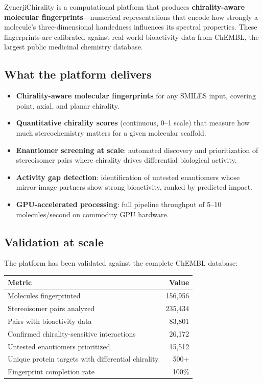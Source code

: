\documentclass[11pt,a4paper]{article}
\begin{document}
ZynerjiChirality is a computational platform that produces \textbf{chirality-aware
molecular fingerprints}---numerical representations that encode how strongly a
molecule's three-dimensional handedness influences its spectral properties. These
fingerprints are calibrated against real-world bioactivity data from ChEMBL, the
largest public medicinal chemistry database.

\subsection*{What the platform delivers}

\begin{itemize}[leftmargin=1.5em]
  \item \textbf{Chirality-aware molecular fingerprints} for any SMILES input,
    covering point, axial, and planar chirality.
  \item \textbf{Quantitative chirality scores} (continuous, 0--1 scale) that
    measure how much stereochemistry matters for a given molecular scaffold.
  \item \textbf{Enantiomer screening at scale}: automated discovery and
    prioritization of stereoisomer pairs where chirality drives differential
    biological activity.
  \item \textbf{Activity gap detection}: identification of untested enantiomers
    whose mirror-image partners show strong bioactivity, ranked by
    predicted impact.
  \item \textbf{GPU-accelerated processing}: full pipeline throughput of
    5--10 molecules/second on commodity GPU hardware.
\end{itemize}

\subsection*{Validation at scale}

The platform has been validated against the complete ChEMBL database:

\begin{center}
\begin{tabular}{lr}
\toprule
\textbf{Metric} & \textbf{Value} \\
\midrule
Molecules fingerprinted & 156,956 \\
Stereoisomer pairs analyzed & 235,434 \\
Pairs with bioactivity data & 83,801 \\
Confirmed chirality-sensitive interactions & 26,172 \\
Untested enantiomers prioritized & 15,512 \\
Unique protein targets with differential chirality & 500+ \\
Fingerprint completion rate & 100\% \\
\bottomrule
\end{tabular}
\end{center}
\end{document}
